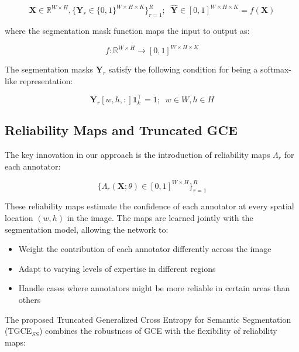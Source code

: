 \begin{equation}
  \mathbf X \in \mathbb{R}^{W \times H}, \{ \mathbf Y_r \in
  \{0,1\}^{W \times H \times K} \}_{r=1}^R; \;\; \mathbf {\hat Y} \in
  [0,1]^{W\times H \times K} = f(\mathbf X)
\end{equation}

where the segmentation mask function maps the input to output as:

\begin{equation}
  f: \mathbb  R ^{W\times H} \to [0,1]^{W\times H\times K}
\end{equation}

The segmentation masks $\mathbf Y_r$ satisfy the following condition
for being a softmax-like representation:

\begin{equation}
  \mathbf Y_r[w,h,:] \mathbf{1} ^ \top _ k = 1; \;\; w \in W, h \in H
\end{equation}

\subsection{Reliability Maps and Truncated GCE}

The key innovation in our approach is the introduction of reliability
maps $\Lambda_r$ for each annotator:

\begin{equation}
  \bigg\{ \Lambda_r (\mathbf X; \theta ) \in [0,1] ^{W\times H} \bigg\}_{r=1}^R
\end{equation}

These reliability maps estimate the confidence of each annotator at
every spatial location $(w,h)$ in the image. The maps are learned
jointly with the segmentation model, allowing the network to:

\begin{itemize}
  \item Weight the contribution of each annotator differently across the image
  \item Adapt to varying levels of expertise in different regions
  \item Handle cases where annotators might be more reliable in
    certain areas than others
\end{itemize}

The proposed Truncated Generalized Cross Entropy for Semantic
Segmentation (TGCE$_{SS}$) combines the robustness of GCE with the
flexibility of reliability maps:

